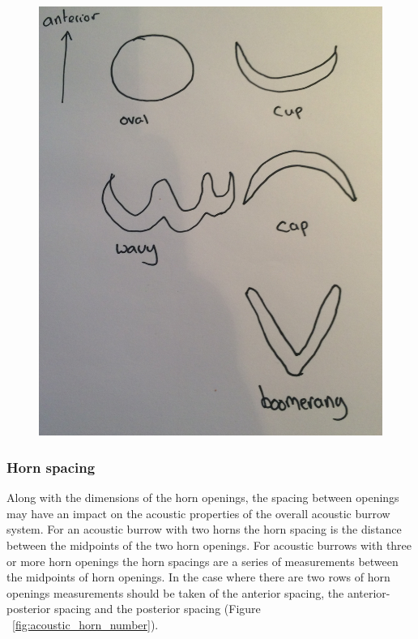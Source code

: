 \documentclass{article}
\begin{document}
   \begin{figure}[h]
   	\includegraphics[width=\textwidth]{acoustic_opening_shape}
   	\caption{}
   	\label{fig:acoustic_opening_shape}
   \end{figure}
   
   \subsubsection{Horn spacing}
   Along with the dimensions of the horn openings, the spacing between openings may have an impact on the acoustic properties of the overall acoustic burrow system. For an acoustic burrow with two horns the horn spacing is the distance between the midpoints of the two horn openings. For acoustic burrows with three or more horn openings the horn spacings are a series of measurements between the midpoints of horn openings. In the case where there are two rows of horn openings measurements should be taken of the anterior spacing, the anterior-posterior spacing and the posterior spacing (Figure ~\ref{fig:acoustic_horn_number}).
   
\end{document}
